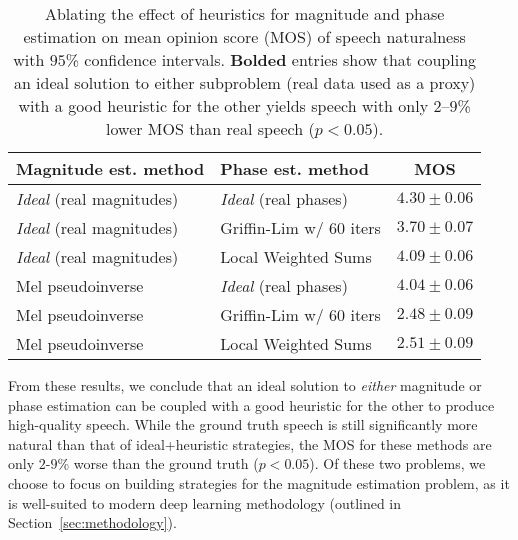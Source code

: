 \documentclass[a4paper]{article}
\begin{document}
\begin{table}[t]
\centering
\caption{Ablating the effect of heuristics for magnitude and phase estimation on mean opinion score (MOS) of speech naturalness with $95$\% confidence intervals.
\textbf{Bolded} entries show that coupling an ideal solution to either subproblem (real data used as a proxy) with a good heuristic for the other yields speech with only $2$--$9$\% lower
MOS than real speech ($p<0.05$).
}
\footnotesize
\begin{tabular}{llc}
\toprule
Magnitude est. method & Phase est. method & MOS \\
\midrule
\emph{Ideal} (real magnitudes) & \emph{Ideal} (real phases) & $4.30 \pm 0.06$ \\
\emph{Ideal} (real magnitudes) & Griffin-Lim w/ $60$ iters & $3.70 \pm 0.07$ \\
\emph{Ideal} (real magnitudes) & Local Weighted Sums & $\mathbf{4.09 \pm 0.06}$  \\
Mel pseudoinverse & \emph{Ideal} (real phases) & $\mathbf{4.04 \pm 0.06}$ \\
Mel pseudoinverse & Griffin-Lim w/ $60$ iters & $2.48 \pm 0.09$ \\
Mel pseudoinverse & Local Weighted Sums & $2.51 \pm 0.09$  \\
\bottomrule
\end{tabular}
\label{tab:gl}
\end{table}

From these results, we conclude that an ideal solution to \emph{either} magnitude or phase estimation can be coupled with a good heuristic for the other to produce high-quality speech. 
While the ground truth speech is still significantly more natural than that of ideal+heuristic strategies, 
the MOS for these methods are only $2$-$9$\% worse than the ground truth ($p < 0.05$). 
Of these two problems, 
we choose to focus on building strategies for the magnitude estimation problem, 
as it is well-suited to modern deep learning methodology (outlined in Section~\ref{sec:methodology}).
\end{document}
